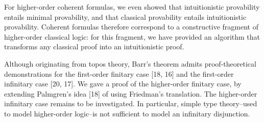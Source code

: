  
 
For higher-order coherent formulas, we even showed that intuitionistic provability entails minimal provability, and that classical provability entails intuitionistic provability. Coherent formulas therefore correspond to a constructive fragment of higher-order classical logic: for this fragment, we have provided an algorithm that transforms any classical proof into an intuitionistic proof.\par
 
 
 
Although originating from topos theory, Barr’s theorem admits proof-theoretical demonstrations for the first-order finitary case [18, 16] and the first-order infinitary case [20, 17]. We gave a proof of the higher-order finitary case, by extending Palmgren’s idea [18] of using Friedman’s translation. The higher-order infinitary case remains to be investigated. In particular, simple type theory–used to model higher-order logic–is not sufficient to model an infinitary disjunction.\par
 
 
